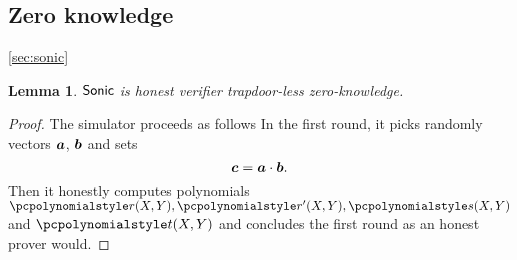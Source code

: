 \let\accentvec\vec \documentclass[runningheads,10pt]{llncs}
\def\vec#1{\mathchoice{\mbox{\boldmath$\displaystyle#1$}}
{\mbox{\boldmath$\textstyle#1$}} {\mbox{\boldmath$\scriptstyle#1$}}
{\mbox{\boldmath$\scriptscriptstyle#1$}}}
\newtheorem{lemma}[theorem]{Lemma}
\begin{document}
\subsection{Zero knowledge}
\cref{sec:sonic}
\begin{lemma}
	${\textnormal{\textsf{Sonic}}}$ is honest verifier trapdoor-less zero-knowledge.	
\end{lemma}
\begin{proof}
The simulator proceeds as follows
In the first round, it picks randomly vectors $\vec{a}$, $\vec{b}$ and sets
\begin{equation}
		\label{eq:ab_eq_c}
		\vec{c} = \vec{a} \cdot \vec{b}. 
\end{equation}
Then it honestly computes polynomials
$\p{r}(X, Y), \p{r'}(X, Y), \p{s}(X, Y)$ and $\p{t}(X, Y)$ and concludes the
first round as an honest prover would. 


\end{proof}
\end{document}
